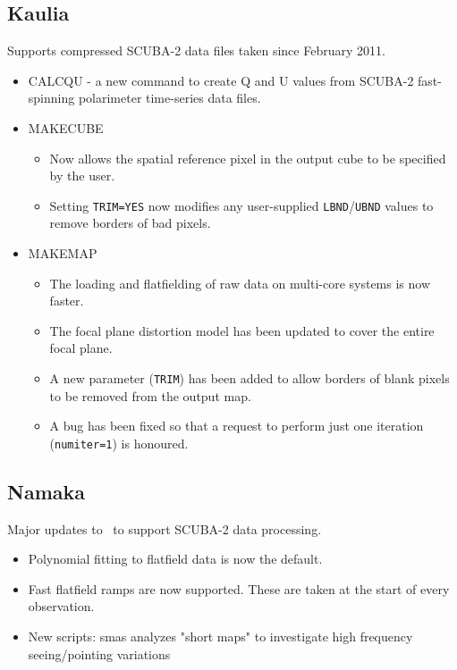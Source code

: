 \documentclass[oneside,11pt]{starlink}
\begin{document}
\subsection{Kaulia}

Supports compressed SCUBA-2 data files taken since February 2011.

\begin{itemize}
\item CALCQU - a new command to create Q and U values from SCUBA-2
  fast-spinning polarimeter time-series data files.
\item MAKECUBE
\begin{itemize}
\item Now allows the spatial reference pixel in the output cube to be
  specified by the user.
\item Setting \texttt{TRIM=YES} now modifies any user-supplied
  \texttt{LBND}/\texttt{UBND} values to remove borders of bad pixels.
\end{itemize}
\item MAKEMAP
\begin{itemize}
\item The loading and flatfielding of raw data on multi-core systems
  is now faster.
\item The focal plane distortion model has been updated to cover the
  entire focal plane.
\item A new parameter (\texttt{TRIM}) has been added to allow borders
  of blank pixels to be removed from the output map.
\item A bug has been fixed so that a request to perform just one
  iteration (\texttt{numiter=1}) is honoured.
\end{itemize}
\end{itemize}

\subsection{Namaka}

Major updates to \SMURF\ to support SCUBA-2 data processing.

\begin{itemize}
\item Polynomial fitting to flatfield data is now the default.
\item Fast flatfield ramps are now supported. These are taken at the
  start of every observation.
\item New scripts: smas analyzes "short maps" to investigate high
  frequency seeing/pointing variations
\end{itemize}
\end{document}
